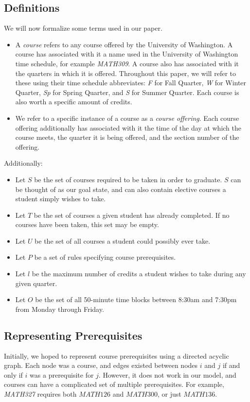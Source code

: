 \documentclass[11pt]{article} %
\begin{document}
\subsection{Definitions} We will now formalize some terms used in our paper.
\begin{itemize} \item A {\it course} refers to any course offered by the
University of Washington. A course has associated with it a name used in the
University of Washington time schedule, for example {\it MATH309}. A course also
has associated with it the quarters in which it is offered. Throughout this
paper, we will refer to these using their time schedule abbreviates: {\it F} for
Fall Quarter, {\it W} for Winter Quarter, {\it Sp} for Spring Quarter, and {\it
S} for Summer Quarter. Each course is also worth a specific amount of credits.
\item We refer to a specific instance of a course as a {\it course offering}.
Each course offering additionally has associated with it the time of the day at
which the course meets, the quarter it is being offered, and the section number
of the offering.  \end{itemize}

Additionally: \begin{itemize} \item Let $S$ be the set of courses required to be
taken in order to graduate. $S$ can be thought of as our goal state, and can
also contain elective courses a student simply wishes to take.  \item Let $T$ be
the set of courses a given student has already completed. If no courses have
been taken, this set may be empty.  \item Let $U$ be the set of all courses
a student could possibly ever take.  \item Let $P$ be a set of rules specifying
course prerequisites.  \item Let $l$ be the maximum number of credits a student
wishes to take during any given quarter.  \item Let $O$ be the set of all
50-minute time blocks between 8:30am and 7:30pm from Monday through Friday.
\end{itemize}

\subsection{Representing Prerequisites} Initially, we hoped to represent course
prerequisites using a directed acyclic graph. Each node was a course, and edges
existed between nodes $i$ and $j$ if and only if $i$ was a prerequisite for $j$.
However, it does not work in our model, and courses can have a complicated set
of multiple prerequisites.  For example, {\it MATH327} requires both $MATH126$
and $MATH300$, or just $MATH136$. 
\end{document}
